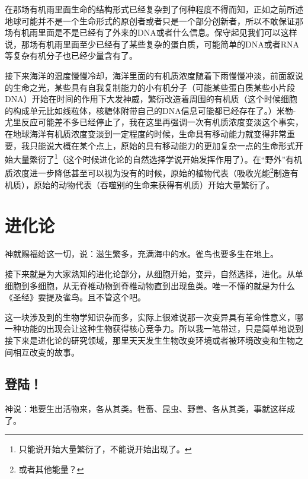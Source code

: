 \documentclass[12pt]{exam}%
\begin{document}
在那场有机雨里面生命的结构形式已经复杂到了何种程度不得而知，正如之前所述地球可能并不是一个生命形式的原创者或者只是一个部分创新者，所以不敢保证那场有机雨里面是不是已经有了外来的DNA或者什么信息。保守起见我们可以这样说，那场有机雨里面至少已经有了某些复杂的蛋白质，可能简单的DNA或者RNA等复杂有机分子也已经少量含有了。

接下来海洋的温度慢慢冷却，海洋里面的有机质浓度随着下雨慢慢冲淡，前面叙说的生命之光，某些具有自我复制能力的小有机分子（可能某些蛋白质某些小片段DNA）开始在时间的作用下大发神威，繁衍改造着周围的有机质（这个时候细胞的构成单元比如线粒体，核糖体附带自己的DNA信息可能都已经存在了。）米勒-尤里反应可能差不多已经停止了，我在这里再强调一次有机质浓度变淡这个事实，在地球海洋有机质浓度变淡到一定程度的时候，生命具有移动能力就变得非常重要，我只能说大概在某个点上，原始的具有移动能力的更加复杂一点的生命形式开始大量繁衍了\footnote{只能说开始大量繁衍了，不能说开始出现了。}（这个时候进化论的自然选择学说开始发挥作用了）。在“野外”有机质浓度进一步降低甚至可以视为没有的时候，原始的植物代表（吸收光能\footnote{或者其他能量？}制造有机质），原始的动物代表（吞噬别的生命来获得有机质）开始大量繁衍了。


\section{进化论}
\begin{flushright}
\begin{notecard}[ce7f4fe]{15em}
神就赐福给这一切，说：滋生繁多，充满海中的水。雀鸟也要多生在地上。  
\end{notecard}
\end{flushright}

接下来就是为大家熟知的进化论部分，从细胞开始，变异，自然选择，进化。从单细胞到多细胞，从无脊椎动物到脊椎动物直到出现鱼类。唯一不懂的就是为什么《圣经》要提及雀鸟。且不管这个吧。

这一块涉及到的生物学知识杂而多，实际上很难说那一次变异具有革命性意义，哪一种功能的出现会让这种生物获得核心竞争力。所以我一笔带过，只是简单地说到接下来是进化论的研究领域，那里天天发生生物改变环境或者被环境改变和生物之间相互改变的故事。


\subsection{登陆！}
\begin{flushright}
\begin{notecard}[ce7f4fe]{15em}
神说：地要生出活物来，各从其类。牲畜、昆虫、野兽、各从其类，事就这样成了。 
\end{notecard}
\end{flushright}
\end{document}
